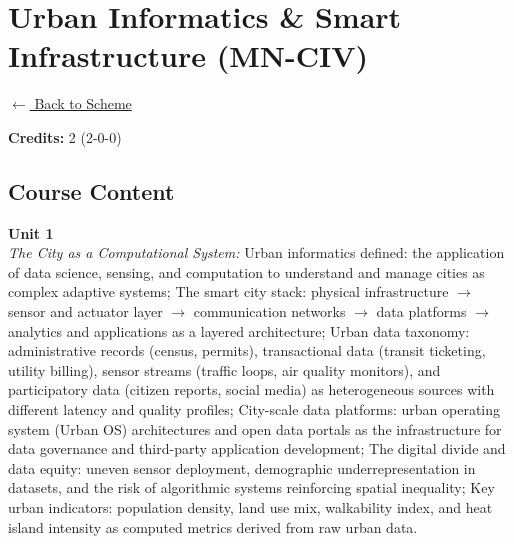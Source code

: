 \section*{Urban Informatics \& Smart Infrastructure (MN-CIV)}
\label{minor:CIV_L1}

\noindent \small{\hyperref[main:scheme]{$\leftarrow$ Back to Scheme}} \vspace{0.5cm}

\noindent \textbf{Credits:} 2 (2-0-0)

\subsection*{Course Content}
\noindent\textbf{Unit 1} \\
\textit{The City as a Computational System:} Urban informatics defined: the application of data science, sensing, and computation to understand and manage cities as complex adaptive systems; The smart city stack: physical infrastructure $\rightarrow$ sensor and actuator layer $\rightarrow$ communication networks $\rightarrow$ data platforms $\rightarrow$ analytics and applications as a layered architecture; Urban data taxonomy: administrative records (census, permits), transactional data (transit ticketing, utility billing), sensor streams (traffic loops, air quality monitors), and participatory data (citizen reports, social media) as heterogeneous sources with different latency and quality profiles; City-scale data platforms: urban operating system (Urban OS) architectures and open data portals as the infrastructure for data governance and third-party application development; The digital divide and data equity: uneven sensor deployment, demographic underrepresentation in datasets, and the risk of algorithmic systems reinforcing spatial inequality; Key urban indicators: population density, land use mix, walkability index, and heat island intensity as computed metrics derived from raw urban data.

\vspace{0.3cm}

